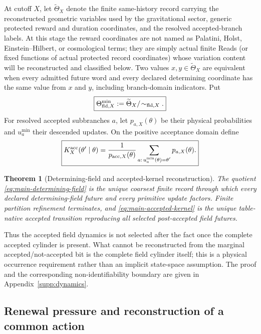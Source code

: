\documentclass[11pt]{article}
\newtheorem{theorem}{Theorem}[section]
\theoremstyle{definition}
\theoremstyle{remark}
\begin{document}
At cutoff $X$, let $\widetilde\Theta_X$ denote the finite same-history record
carrying the reconstructed geometric variables used by the gravitational
sector, generic protected reward and duration coordinates, and the resolved
accepted-branch labels.  At this stage the reward coordinates are not named as
Palatini, Holst, Einstein--Hilbert, or cosmological terms; they are simply actual
finite Reads (or fixed functions of actual protected record coordinates) whose
variation content will be reconstructed and classified below.  Two values
$x,y\in\widetilde\Theta_X$ are equivalent
when every admitted future word and every declared determining coordinate has
the same value from $x$ and $y$, including branch-domain indicators.  Put
\begin{equation}
 \boxed{
 \Theta_{{\rm fld},X}^{\min}
 :=\widetilde\Theta_X/\!\sim_{{\rm fld},X}.}
 \label{eq:main-determining-field}
\end{equation}
For resolved accepted subbranches $a$, let $p_{a,X}(\theta)$ be their physical
probabilities and $u_a^{\min}$ their descended updates.  On the positive
acceptance domain define
\begin{equation}
 \boxed{
 K_X^{\rm acc}(\theta'\mid\theta)
 =\frac{1}{p_{{\rm acc},X}(\theta)}
   \sum_{\substack{a:\,u_a^{\min}(\theta)=\theta'}}p_{a,X}(\theta).}
 \label{eq:main-accepted-kernel}
\end{equation}

\begin{theorem}[Determining-field and accepted-kernel reconstruction]
\label{thm:main-determining-kernel}
The quotient \eqref{eq:main-determining-field} is the unique coarsest finite
record through which every declared determining-field future and every
primitive update factors.  Finite partition refinement terminates, and
\eqref{eq:main-accepted-kernel} is the unique table-native accepted transition
reproducing all selected post-accepted field futures.
\end{theorem}

Thus the accepted field dynamics is not selected after the fact once the
complete accepted cylinder is present.  What cannot be reconstructed from the
marginal accepted/not-accepted bit is the complete field cylinder itself; this
is a physical occurrence requirement rather than an implicit state-space
assumption.  The proof and the corresponding non-identifiability boundary are
given in Appendix~\ref{supp:dynamics}.

\subsection{Renewal pressure and reconstruction of a common action}
\end{document}
